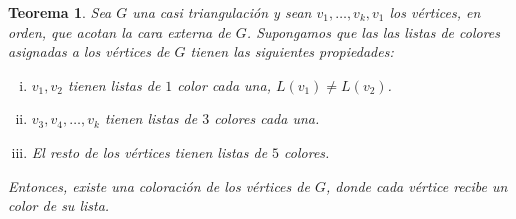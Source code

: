 \documentclass[12pt]{report}
\theoremstyle{plain}
\newtheorem{theorem}{Teorema}[section]
\theoremstyle{definition}
\begin{document}
\begin{theorem}
Sea $G$ una casi triangulación y sean $v_1, \ldots, v_k, v_1$ los vértices, en orden, que acotan la cara externa de $G$. Supongamos que las las listas de colores asignadas a los vértices de $G$ tienen las siguientes propiedades:
\begin{enumerate}[(i)]
\item $v_1,v_2$ tienen listas de $1$ color cada una, $L(v_1) \neq L(v_2)$.
\item $v_3, v_4, \ldots, v_k$ tienen listas de $3$ colores cada una.
\item El resto de los vértices tienen listas de $5$ colores.
\end{enumerate}
Entonces, existe una coloración de los vértices de $G$, donde cada vértice recibe un color de su lista.
\end{theorem}
\end{document}
